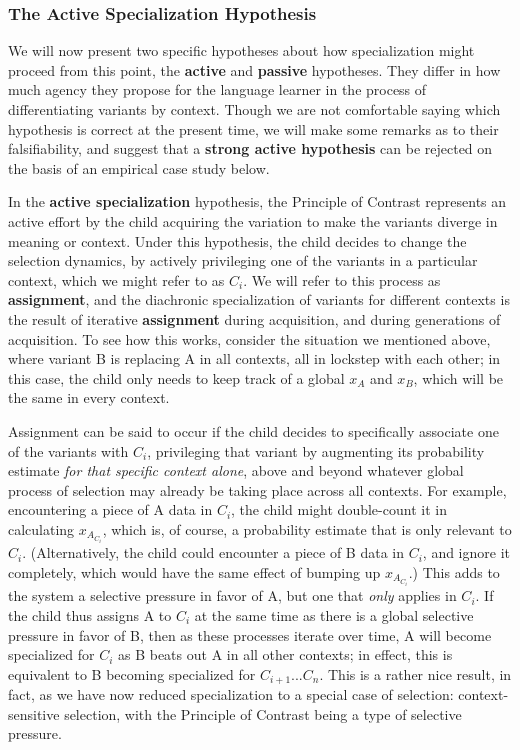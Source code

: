 \subsubsection{The Active Specialization Hypothesis}

We will now present two specific hypotheses about how specialization might proceed from this point, the \textbf{active} and \textbf{passive} hypotheses.
They differ in how much agency they propose for the language learner in the process of differentiating variants by context.
Though we are not comfortable saying which hypothesis is correct at the present time, we will make some remarks as to their falsifiability, and suggest that a \textbf{strong active hypothesis} can be rejected on the basis of an empirical case study below.

In the \textbf{active specialization} hypothesis, the Principle of Contrast represents an active effort by the child acquiring the variation to make the variants diverge in meaning or context.
Under this hypothesis, the child decides to change the selection dynamics, by actively privileging one of the variants in a particular context, which we might refer to as $C_i$.
We will refer to this process as \textbf{assignment}, and the diachronic specialization of variants for different contexts is the result of iterative \textbf{assignment} during acquisition, and during generations of acquisition.
To see how this works, consider the situation we mentioned above, where variant B is replacing A in all contexts, all in lockstep with each other; in this case, the child only needs to keep track of a global $x_A$ and $x_B$, which will be the same in every context.

Assignment can be said to occur if the child decides to specifically associate one of the variants with $C_i$, privileging that variant by augmenting its probability estimate \textsl{for that specific context alone}, above and beyond whatever global process of selection may already be taking place across all contexts.
For example, encountering a piece of A data in $C_i$, the child might double-count it in calculating $x_{A_{C_i}}$, which is, of course, a probability estimate that is only relevant to $C_i$.
(Alternatively, the child could encounter a piece of B data in $C_i$, and ignore it completely, which would have the same effect of bumping up $x_{A_{C_i}}$.)
This adds to the system a selective pressure in favor of A, but one that \textsl{only} applies in $C_i$.
If the child thus assigns A to $C_i$ at the same time as there is a global selective pressure in favor of B, then as these processes iterate over time, A will become specialized for $C_i$ as B beats out A in all other contexts; in effect, this is equivalent to B becoming specialized for $C_{i+1}$...$C_n$.
This is a rather nice result, in fact, as we have now reduced specialization to a special case of selection: context-sensitive selection, with the Principle of Contrast being a type of selective pressure.



